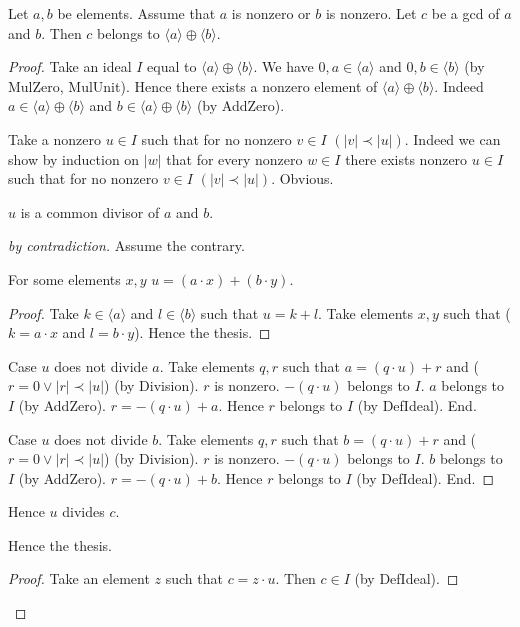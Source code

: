 \documentclass{article}
\begin{document}
  \begin{forthel}
    \begin{theorem}\label{GCDin}
      Let $a,b$ be elements.
      Assume that $a$ is nonzero or $b$ is nonzero.
      Let $c$ be a gcd of $a$ and $b$.
      Then $c$ belongs to $\langle a \rangle \oplus \langle b \rangle$.
    \end{theorem}
    \begin{proof}
      Take an ideal $I$ equal to $\langle a \rangle \oplus \langle b \rangle$.
      We have $0,a \in \langle a \rangle$ and $0,b \in \langle b \rangle$
      (by MulZero, MulUnit).
      Hence there exists a nonzero element of
      $\langle a \rangle \oplus \langle b \rangle$.
      Indeed $a \in \langle a \rangle \oplus \langle b \rangle$ and
      $b \in \langle a \rangle \oplus \langle b \rangle$ (by AddZero).

      Take a nonzero $u \in I$ such that for no nonzero
      $v \in I$ $(|v| \prec |u|)$.
      Indeed we can show by induction on $|w|$ that for every nonzero $w \in I$
      there exists nonzero $u \in I$ such that for no nonzero
      $v \in I$ $(|v| \prec |u|)$.
      Obvious.

      $u$ is a common divisor of $a$ and $b$.
      \begin{proof}[by contradiction]
        Assume the contrary.

        For some elements $x,y$ $u = (a \cdot x) + (b \cdot y)$.
        \begin{proof}
          Take $k \in \langle a \rangle$ and $l \in \langle b \rangle$ such that
          $u = k + l$.
          Take elements $x,y$ such that ($k = a \cdot x$ and $l = b \cdot y$).
          Hence the thesis.
        \end{proof}

        Case $u$ does not divide $a$.
          Take elements $q,r$ such that $a = (q \cdot u) + r$ and
          ($r = 0 \vee |r| \prec |u|$) (by Division).
          $r$ is nonzero.
          $-(q \cdot u)$ belongs to $I$.
          $a$ belongs to $I$ (by AddZero).
          $r = - (q \cdot u) + a$.
          Hence $r$ belongs to $I$ (by DefIdeal).
        End.

        Case $u$ does not divide $b$.
          Take elements $q,r$ such that $b = (q \cdot u) + r$ and
          ($r = 0 \vee |r| \prec |u|$) (by Division).
          $r$ is nonzero.
          $-(q \cdot u)$ belongs to $I$.
          $b$ belongs to $I$ (by AddZero).
          $r = - (q \cdot u) + b$.
          Hence $r$ belongs to $I$ (by DefIdeal).
        End.
      \end{proof}

      Hence $u$ divides $c$.

      Hence the thesis.
      \begin{proof}
        Take an element $z$ such that $c = z \cdot u$.
        Then $c \in I$ (by DefIdeal).
      \end{proof}
    \end{proof}
  \end{forthel}
\end{document}
